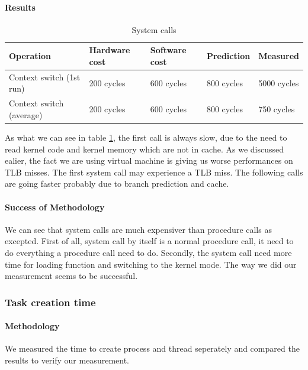 \paragraph{Results}
\begin{table} [h]
\begin{center}
\begin{tabular}{| l | l | l | l | l |}
\hline
Operation 				& Hardware cost & Software cost & Prediction & Measured \\
\hline
Context switch (1st run) & 200 cycles & 600 cycles & 800 cycles & 5000 cycles\\
\hline
Context switch (average) & 200 cycles & 600 cycles & 800 cycles & 750 cycles\\
\hline
\end{tabular}
\end{center}

\caption{System calls\label {tab:sysCall}}
\end{table}


As what we can see in table \ref{tab:sysCall}, the first call is always slow,
due to the need to read kernel code and kernel memory which are not in cache.
As we discussed ealier, the fact we are using virtual machine is giving us worse
performances on TLB misses.
The first system call may experience a TLB miss.
The following calls are going faster probably due to branch prediction and
cache.

\paragraph{Success of Methodology}
We can see that system calls are much expensiver than procedure calls as excepted.
First of all, system call by itself is a normal procedure call, it need to do everything a procedure call need to do.
Secondly, the system call need more time for loading function and switching to the kernel mode.
The way we did our measurement seems to be successful.



\subsubsection{Task creation time}
\paragraph{Methodology}
We measured the time to create process and thread seperately and
compared the results to verify our measurement.

